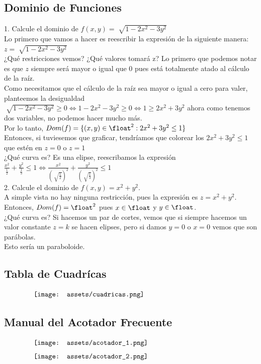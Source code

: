 \documentclass[10pt,a4paper]{article}
\begin{document}
\subsection*{Dominio de Funciones}
\label{subsec:dominio_funciones}
1. Calcule el dominio de $ f(x,y) = \sqrt[]{1-2x^{2}-3y^{2}}$ \\
Lo primero que vamos a hacer es reescribir la expresión de la siguiente manera: $ z = \sqrt[]{1-2x^{2}-3y^{2}} $ \\
¿Qué restricciones vemos? ¿Qué valores tomará z? Lo primero que podemos notar es que $z$ siempre será mayor o igual que 0 pues está totalmente atado al cálculo de la raíz. \\
Como necesitamos que el cálculo de la raíz sea mayor o igual a cero para valer, planteemos la desigualdad $\sqrt[]{1-2x^{2}-3y^{2}} \ge 0 \iff 1-2x^{2}-3y^{2} \ge 0 \iff 1 \ge 2x^{2}+3y^{2}  $ ahora como tenemos dos variables, no podemos hacer mucho más. \\
Por lo tanto, $Dom(f) = \{(x, y) \in \float^{2} : 2x^{2} + 3y^{2} \le 1\}$ \\
Entonces, si tuviesemos que graficar, tendríamos que colorear los $2x^{2} + 3y^{2} \le 1$ que estén en $z=0$ o $z=1$ \\
¿Qué curva es? Es una elipse, reescribamos la expresión $ \frac{x^{2}}{\frac{1}{2}} + \frac{y^{2}}{\frac{1}{3}} \le 1 \iff \frac{x^{2}}{(\sqrt[]{\frac{1}{2}})^{2}} + \frac{y^{2}}{(\sqrt[]{\frac{1}{3}})^{2}} \le 1$ \\
2. Calcule el dominio de $f(x,y) = x^{2} + y^{2}$. \\
A simple vista no hay ninguna restricción, pues la expresión es $z = x^{2} + y^{2}$. Entonces, $Dom(f) = \float^{2}$ pues $x \in \float$ y $y \in \float$. \\
¿Qué curva es? Si hacemos un par de cortes, vemos que si siempre hacemos un valor constante $ z = k$ se hacen elipses, pero si damos $y = 0$ o $x=0$ vemos que son parábolas. \\
Esto sería un paraboloide.
\subsection*{Tabla de Cuadrícas}
\label{subsec:tabla_cuadricas}
\[\begin{minipage}[b]{0.8\textwidth}
    \texttt{[image: assets/cuadricas.png]}
\end{minipage}\]
\subsection*{Manual del Acotador Frecuente}
\label{subsec:acotador_frecuente}
\[\begin{minipage}[b]{0.8\textwidth}
    \texttt{[image: assets/acotador\_1.png]}
\end{minipage}\]
\[\begin{minipage}[b]{0.8\textwidth}
    \texttt{[image: assets/acotador\_2.png]}
\end{minipage}\]
\end{document}
